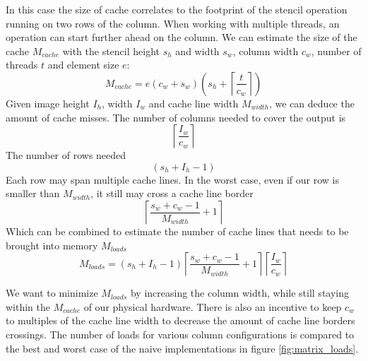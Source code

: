 \documentclass{article}
\newcommand{\ceil}[1]{\left\lceil #1 \right\rceil}
\begin{document}
In this case the size of cache correlates to the footprint of the stencil operation running on two rows of the column.
When working with multiple threads, an operation can start further ahead on the column.
We can estimate the size of the cache $M_{cache}$ with the stencil height $s_h$ and width $s_w$, column width $c_w$, number of threads $t$ and element size $e$:
\[
    M_{cache} = e (c_w + s_w) \left(s_h + \ceil{\frac{t}{c_w}}\right) 
\]
Given image height $I_h$, width $I_w$ and cache line width $M_{width}$, we can deduce the amount of cache misses.
The number of columns needed to cover the output is
\[
    \ceil{\frac{I_w}{c_w}}
\]
The number of rows needed
\[
    (s_h + I_h - 1)    
\]
Each row may span multiple cache lines. In the worst case, even if our row is smaller than $M_{width}$, it still may cross a cache line border
\[
    \ceil{\frac{s_w + c_w - 1}{M_{width}} + 1}
\]
Which can be combined to estimate the number of cache lines that needs to be brought into memory $M_{loads}$
\[
    M_{loads} = (s_h + I_h - 1)\ceil{\frac{s_w + c_w - 1}{M_{width}} + 1}\ceil{\frac{I_w}{c_w}}
\]

We want to minimize $M_{loads}$ by increasing the column width, while still staying within the $M_{cache}$ of our physical hardware.
There is also an incentive to keep $c_w$ to multiples of the cache line width to decrease the amount of cache line borders crossings.
The number of loads for various column configurations is compared to the best and worst case of the naive implementations in figure \ref{fig:matrix_loads}.
\end{document}
